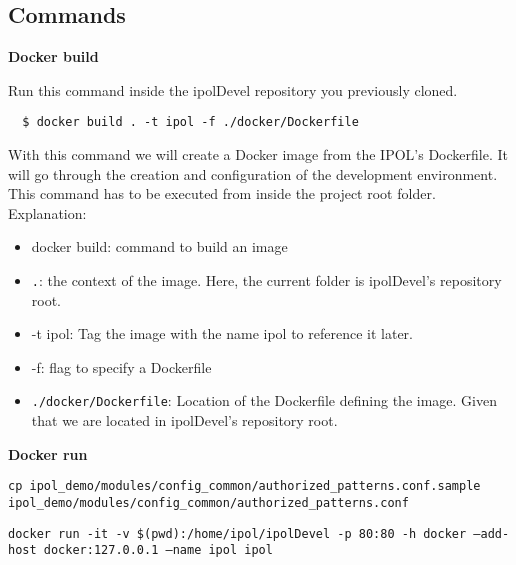 \documentclass[a4paper,12pt]{article}
\begin{document}
\subsection{Commands}
\label{sec:docker_commands}

\textbf{Docker build}

Run this command inside the ipolDevel repository you previously cloned.

\begin{verbatim}
  $ docker build . -t ipol -f ./docker/Dockerfile
\end{verbatim}

With this command we will create a Docker image from the IPOL's Dockerfile. It will go through the creation and configuration of the development environment. This command has to be executed from inside the project root folder. Explanation:
\begin{itemize}
  \item docker build: command to build an image
  \item {\tt .}: the context of the image. Here, the current folder is ipolDevel's repository root.
  \item -t ipol: Tag the image with the name ipol to reference it later.
  \item -f: flag to specify a Dockerfile
  \item {\tt ./docker/Dockerfile}: Location of the Dockerfile defining the image. Given that we are located in ipolDevel's repository root.
\end{itemize}

\textbf{Docker run}

  {\tt cp ipol\_demo/modules/config\_common/authorized\_patterns.conf.sample ipol\_demo/modules/config\_common/authorized\_patterns.conf}
  
  {\tt docker run -it -v \$(pwd):/home/ipol/ipolDevel -p 80:80 -h docker --add-host docker:127.0.0.1 --name ipol ipol}
\end{document}
